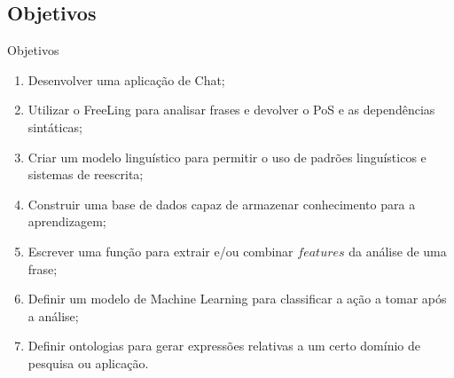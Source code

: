 \documentclass{beamer}
\begin{document}

\subsection{Objetivos}

\begin{frame}{Objetivos}



\begin{enumerate}
\item Desenvolver uma aplicação de Chat; \pause
\item Utilizar o FreeLing para analisar frases e devolver o PoS e as dependências sintáticas; \pause
\item Criar um modelo linguístico para permitir o uso de padrões linguísticos e sistemas de reescrita; \pause
\item Construir uma base de dados capaz de armazenar conhecimento para a aprendizagem; \pause
\item Escrever uma função para extrair e/ou combinar $features$ da análise de uma frase; \pause
\item Definir um modelo de Machine Learning para classificar a ação a tomar após a análise; \pause
\item Definir ontologias para gerar expressões relativas a um certo domínio de pesquisa ou aplicação.
\end{enumerate}

\end{frame}
\end{document}
